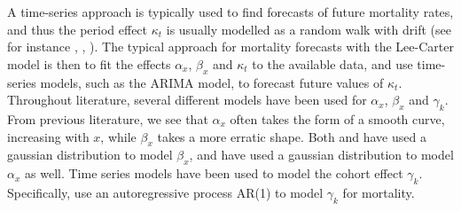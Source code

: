 \newpar A time-series approach is typically used to find forecasts of future mortality rates, and thus the period effect $\kappa_t$ is usually modelled as a random walk with drift (see for instance \textcite{LeeCarter1992}, \textcite{Wisniowski2015}, \textcite{CZADO2005260}). The typical approach for mortality forecasts with the Lee-Carter model is then to fit the effects $\alpha_x$, $\beta_x$ and $\kappa_t$ to the available data, and use time-series models, such as the ARIMA model, to forecast future values of $\kappa_t$. Throughout literature, several different models have been used for $\alpha_x$, $\beta_x$ and $\gamma_k$. From previous literature, we see that $\alpha_x$ often takes the form of a smooth curve, increasing with $x$, while $\beta_x$ takes a more erratic shape. Both \textcite{CZADO2005260} and \textcite{Wisniowski2015} have used a gaussian distribution to model $\beta_x$, and \textcite{Wisniowski2015} have used a gaussian distribution to model $\alpha_x$ as well. Time series models have been used to model the cohort effect $\gamma_k$. Specifically, \textcite{Wisniowski2015} use an autoregressive process AR(1) to model $\gamma_k$ for mortality.

